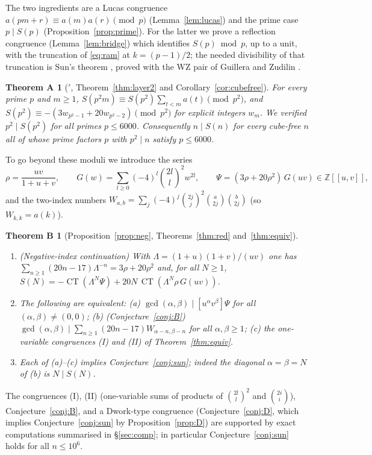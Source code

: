 \documentclass[11pt]{amsart}
\newtheorem*{mainA}{Theorem A}
\newtheorem*{mainB}{Theorem B}
\theoremstyle{definition}
\newcommand{\Z}{\mathbb{Z}}
\newcommand{\CT}{\operatorname{CT}}
\begin{document}
The two ingredients are a Lucas congruence $a(pm+r)\equiv a(m)a(r)\pmod p$
(Lemma~\ref{lem:lucas}) and the prime case $p\mid S(p)$ (Proposition~\ref{prop:prime}). For the
latter we prove a reflection congruence (Lemma~\ref{lem:bridge}) which identifies $S(p)\bmod p$,
up to a unit, with the truncation of \eqref{eq:ram} at $k=(p-1)/2$; the needed divisibility of
that truncation is Sun's theorem \cite[Thm.~1.2]{SunEJC}, proved with the WZ pair of
Guillera \cite{Gu} and Zudilin \cite{Zu}.

\begin{mainA}[$'$, Theorem~\ref{thm:layer2} and Corollary~\ref{cor:cubefree}]
For every prime $p$ and $m\ge1$, $S(p^2m)\equiv S(p^2)\sum_{t<m}a(t)\pmod{p^2}$, and
$S(p^2)\equiv-(3w_{p^2-1}+20w_{p^2-2})\pmod{p^2}$ for explicit integers $w_m$. We verified
$p^2\mid S(p^2)$ for all primes $p\le 6000$. Consequently $n\mid S(n)$ for every cube-free
$n$ all of whose prime factors $p$ with $p^2\mid n$ satisfy $p\le 6000$.
\end{mainA}

To go beyond these moduli we introduce the series
\[
\rho=\frac{uv}{1+u+v},\qquad G(w)=\sum_{l\ge0}(-4)^l\binom{2l}l^2w^{2l},\qquad
\Psi=(3\rho+20\rho^2)\,G(uv)\in\Z[[u,v]],
\]
and the two-index numbers $W_{a,b}=\sum_j(-4)^j\binom{2j}j^2\binom a{2j}\binom b{2j}$
(so $W_{k,k}=a(k)$).

\begin{mainB}[Proposition~\ref{prop:neg}, Theorems~\ref{thm:red} and~\ref{thm:equiv}]
\begin{enumerate}[label=(\roman*)]
\item (Negative-index continuation) With $\Lambda=(1+u)(1+v)/(uv)$ one has
$\sum_{n\ge1}(20n-17)\Lambda^{-n}=3\rho+20\rho^2$ and, for all $N\ge1$,
$S(N)=-\CT(\Lambda^N\Psi)+20N\,\CT(\Lambda^N\rho\,G(uv))$.
\item The following are equivalent:
 (a) $\gcd(\alpha,\beta)\mid[u^\alpha v^\beta]\Psi$ for all $(\alpha,\beta)\ne(0,0)$;
 (b) (Conjecture~\ref{conj:B}) $\gcd(\alpha,\beta)\mid\sum_{n\ge1}(20n-17)W_{\alpha-n,\beta-n}$ for
 all $\alpha,\beta\ge1$;
 (c) the one-variable congruences \textup{(I)} and \textup{(II)} of Theorem~\ref{thm:equiv}.
\item Each of (a)--(c) implies Conjecture~\ref{conj:sun}; indeed the diagonal $\alpha=\beta=N$ of (b)
is $N\mid S(N)$.
\end{enumerate}
\end{mainB}

The congruences (I), (II) (one-variable sums of products of $\binom{2l}l^2$ and
$\binom{2i}i$), Conjecture~\ref{conj:B}, and a Dwork-type congruence
(Conjecture~\ref{conj:D}, which implies Conjecture~\ref{conj:sun} by
Proposition~\ref{prop:D}) are supported by exact computations summarised in
\S\ref{sec:comp}; in particular Conjecture~\ref{conj:sun} holds for all $n\le 10^6$.
\end{document}

